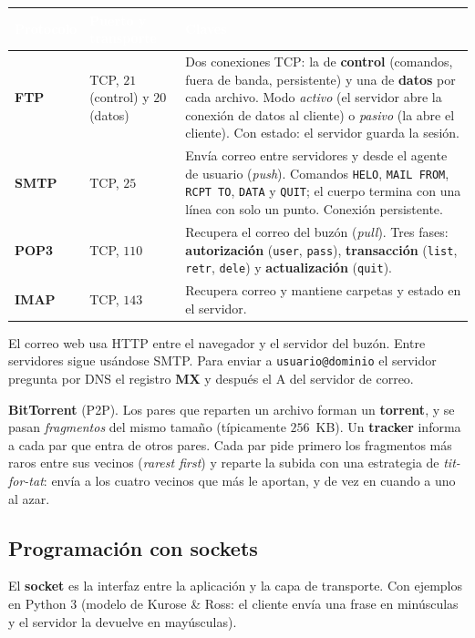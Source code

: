 \documentclass[11pt,a4paper]{article}
\newcommand{\hd}[1]{\cellcolor{uahblue}\textcolor{white}{\textbf{#1}}}
\begin{document}
\begin{tabularx}{\textwidth}{@{}L{2.6cm}L{3.2cm}X@{}}
\toprule
\hd{Protocolo} & \hd{Puerto y transporte} & \hd{Claves} \\
\midrule
\textbf{FTP} & TCP, $21$ (control) y $20$ (datos) & Dos conexiones TCP: la de \textbf{control} (comandos, fuera de banda, persistente) y una de \textbf{datos} por cada archivo. Modo \emph{activo} (el servidor abre la conexión de datos al cliente) o \emph{pasivo} (la abre el cliente). Con estado: el servidor guarda la sesión. \\
\textbf{SMTP} & TCP, $25$ & Envía correo entre servidores y desde el agente de usuario (\emph{push}). Comandos \texttt{HELO}, \texttt{MAIL FROM}, \texttt{RCPT TO}, \texttt{DATA} y \texttt{QUIT}; el cuerpo termina con una línea con solo un punto. Conexión persistente. \\
\textbf{POP3} & TCP, $110$ & Recupera el correo del buzón (\emph{pull}). Tres fases: \textbf{autorización} (\texttt{user}, \texttt{pass}), \textbf{transacción} (\texttt{list}, \texttt{retr}, \texttt{dele}) y \textbf{actualización} (\texttt{quit}). \\
\textbf{IMAP} & TCP, $143$ & Recupera correo y mantiene carpetas y estado en el servidor. \\
\bottomrule
\end{tabularx}

El correo web usa HTTP entre el navegador y el servidor del buzón. Entre servidores sigue usándose SMTP. Para enviar a \texttt{usuario@dominio} el servidor pregunta por DNS el registro \textbf{MX} y después el A del servidor de correo.

\textbf{BitTorrent} (P2P). Los pares que reparten un archivo forman un \textbf{torrent}, y se pasan \emph{fragmentos} del mismo tamaño (típicamente $256$~KB). Un \textbf{tracker} informa a cada par que entra de otros pares. Cada par pide primero los fragmentos más raros entre sus vecinos (\emph{rarest first}) y reparte la subida con una estrategia de \emph{tit-for-tat}: envía a los cuatro vecinos que más le aportan, y de vez en cuando a uno al azar.

\subsection{Programación con sockets}

El \textbf{socket} es la interfaz entre la aplicación y la capa de transporte. Con ejemplos en Python 3 (modelo de Kurose \& Ross: el cliente envía una frase en minúsculas y el servidor la devuelve en mayúsculas).
\end{document}
